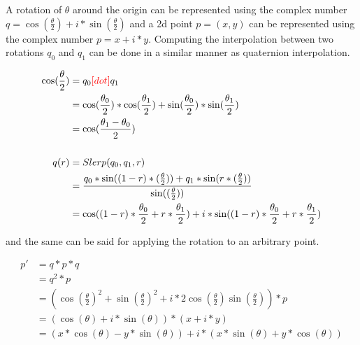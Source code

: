 		A rotation of $\theta$ around the origin can be represented using the complex number \( q = \cos(\frac{\theta}{2}) + i*\sin(\frac{\theta}{2}) \) and a 2d point \( p = (x, y) \) can be represented using the complex number \( p = x + i*y \). Computing the interpolation between two rotations \( q_0 \) and \( q_1 \) can be done in a similar manner as quaternion interpolation.
		
		\begin{equation}
		\begin{split}
		\cos(\frac{\theta}{2})	&= q_0 \textcolor{red}{[dot]} q_1 \\
								&= \cos(\frac{\theta_0}{2})*\cos(\frac{\theta_1}{2}) + \sin(\frac{\theta_0}{2})*\sin(\frac{\theta_1}{2}) \\
								&= \cos(\frac{\theta_1 - \theta_0}{2}) \\
								& \\
		q(r)				&= Slerp(q_0, q_1, r) \\
						&= \frac{q_0 * \sin((1-r)*(\frac{\theta}{2})) + q_1 * \sin(r*(\frac{\theta}{2}))}{\sin((\frac{\theta}{2}))} \\
						&= \cos((1-r)*\frac{\theta_0}{2} + r*\frac{\theta_1}{2}) + i*\sin((1-r)*\frac{\theta_0}{2} + r*\frac{\theta_1}{2}) \\
		\end{split}
		\end{equation}
		
		and the same can be said for applying the rotation to an arbitrary point.
		
		\begin{equation}
		\begin{split}
			p' 	&= q*p*q \\
				&= q^2*p \\
				&= (\cos(\frac{\theta}{2})^2 + \sin(\frac{\theta}{2})^2 + i*2\cos(\frac{\theta}{2})\sin(\frac{\theta}{2}))*p \\
				&= (\cos(\theta) + i*\sin(\theta))*(x + i*y) \\
				&= (x*\cos(\theta) - y*\sin(\theta)) + i*(x*\sin(\theta) + y*\cos(\theta)) \\
		\end{split}
		\end{equation}
			










